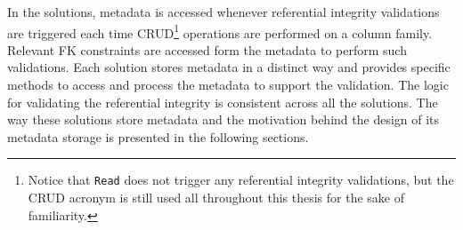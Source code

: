 In the solutions, metadata  is accessed whenever referential integrity
validations are triggered each time 
\ac{CRUD}\footnote{Notice that \texttt{Read} does not trigger
any referential integrity validations, but the \ac{CRUD} acronym is still used
all throughout this thesis for the sake of familiarity.} operations are
performed on a column family.
Relevant \ac{FK} constraints are accessed form the metadata to perform such validations. Each solution stores metadata in a distinct way and provides specific methods to access and process the metadata to
support the validation. The logic for validating the referential integrity is
consistent across all the solutions.
The way these solutions store metadata and the motivation
behind the design of its metadata storage is presented in the following
sections.










